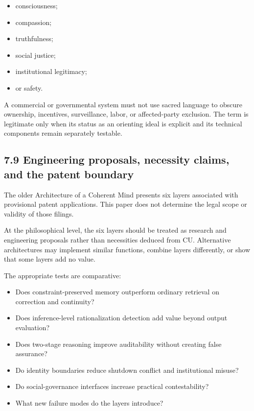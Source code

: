 \documentclass[
  11pt,
]{article}
\providecommand{\tightlist}{%
  \setlength{\itemsep}{0pt}\setlength{\parskip}{0pt}}
\begin{document}
\begin{itemize}
\tightlist
\item
  consciousness;
\item
  compassion;
\item
  truthfulness;
\item
  social justice;
\item
  institutional legitimacy;
\item
  or safety.
\end{itemize}

A commercial or governmental system must not use sacred language to
obscure ownership, incentives, surveillance, labor, or affected-party
exclusion. The term is legitimate only when its status as an orienting
ideal is explicit and its technical components remain separately
testable.

\subsection{7.9 Engineering proposals, necessity claims, and the patent
boundary}\label{engineering-proposals-necessity-claims-and-the-patent-boundary}

The older Architecture of a Coherent Mind presents six layers associated
with provisional patent applications. This paper does not determine the
legal scope or validity of those filings.

At the philosophical level, the six layers should be treated as research
and engineering proposals rather than necessities deduced from CU.
Alternative architectures may implement similar functions, combine
layers differently, or show that some layers add no value.

The appropriate tests are comparative:

\begin{itemize}
\tightlist
\item
  Does constraint-preserved memory outperform ordinary retrieval on
  correction and continuity?
\item
  Does inference-level rationalization detection add value beyond output
  evaluation?
\item
  Does two-stage reasoning improve auditability without creating false
  assurance?
\item
  Do identity boundaries reduce shutdown conflict and institutional
  misuse?
\item
  Do social-governance interfaces increase practical contestability?
\item
  What new failure modes do the layers introduce?
\end{itemize}
\end{document}
